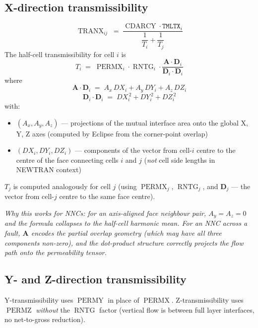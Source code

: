 \documentclass[11pt,a4paper]{article}
\newcommand{\kw}[1]{\texttt{#1}}
\newcommand{\note}[1]{\par\smallskip\textit{#1}\par\smallskip}
\DeclareMathOperator{\CDARCY}{CDARCY}
\DeclareMathOperator{\TRANX}{TRANX}
\DeclareMathOperator{\RNTG}{RNTG}
\DeclareMathOperator{\PERMX}{PERMX}
\DeclareMathOperator{\PERMY}{PERMY}
\DeclareMathOperator{\PERMZ}{PERMZ}
\begin{document}
\subsection*{X-direction transmissibility}
\begin{equation}
\TRANX_{ij} \;=\; \frac{\CDARCY \cdot \kw{TMLTX}_i}{\dfrac{1}{T_i} + \dfrac{1}{T_j}}
\label{eq:newtran-x}
\tag{TD 2.13}
\end{equation}
The half-cell transmissibility for cell $i$ is
\begin{equation}
T_i \;=\; \PERMX_i \cdot \RNTG_i \cdot \frac{\mathbf{A}\cdot\mathbf{D}_i}{\mathbf{D}_i\cdot\mathbf{D}_i}
\label{eq:newtran-Ti}
\end{equation}
where
\begin{equation}
\mathbf{A}\cdot\mathbf{D}_i \;=\; A_x\,DX_i + A_y\,DY_i + A_z\,DZ_i
\label{eq:newtran-AdotD}
\end{equation}
\begin{equation}
\mathbf{D}_i\cdot\mathbf{D}_i \;=\; DX_i^{\,2} + DY_i^{\,2} + DZ_i^{\,2}
\label{eq:newtran-DdotD}
\end{equation}
with:
\begin{itemize}
  \item $(A_x, A_y, A_z)$ — projections of the mutual interface area onto the global X, Y, Z axes (computed by Eclipse from the corner-point overlap)
  \item $(DX_i, DY_i, DZ_i)$ — components of the vector from cell-$i$ centre to the centre of the face connecting cells $i$ and $j$ (\emph{not} cell side lengths in NEWTRAN context)
\end{itemize}

$T_j$ is computed analogously for cell $j$ (using $\PERMX_j$, $\RNTG_j$, and $\mathbf{D}_j$ — the vector from cell-$j$ centre to the same face centre).

\note{Why this works for NNCs: for an axis-aligned face neighbour pair, $A_y = A_z = 0$ and the formula collapses to the half-cell harmonic mean. For an NNC across a fault, $\mathbf{A}$ encodes the partial overlap geometry (which may have all three components non-zero), and the dot-product structure correctly projects the flow path onto the permeability tensor.}

\subsection*{Y- and Z-direction transmissibility}
Y-transmissibility uses $\PERMY$ in place of $\PERMX$. Z-transmissibility uses $\PERMZ$ \emph{without} the $\RNTG$ factor (vertical flow is between full layer interfaces, no net-to-gross reduction).
\end{document}
